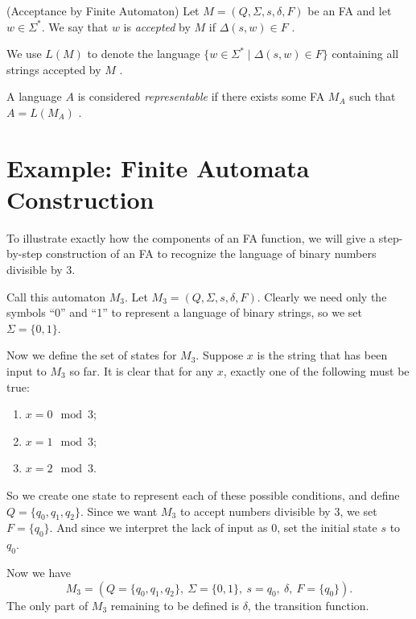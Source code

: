 \documentclass{bcthesis}
\newcommand{\footcite}[2]{\xspace\cite[pg.~{#2}]{#1}\xspace}
\begin{document}
		\begin{definition}(Acceptance by Finite Automaton)
			Let $M = (Q, \Sigma, s, \delta, F)$ be an FA and let $w \in \Sigma^*$.
			We say that $w$ is \textit{accepted} by $M$ if $\Delta(s, w) \in F$ \footcite{hopcroft}{18}.

			We use $L(M)$ to denote the language $\{ w \in \Sigma^* \mid \Delta(s, w) \in F \}$ containing all strings accepted by $M$ \footcite{hopcroft}{18}.

			A language $A$ is considered \textit{representable} if there exists some FA $M_A$ such that $A = L(M_A)$ \footcite{salomaa}{20}.
		\end{definition}

	\section{Example: Finite Automata Construction} %
	\label{sec:ex:m3_construction}
	

		\newcommand{\miii}{\ensuremath{M_3}\xspace}

		To illustrate exactly how the components of an FA function, we will give a step-by-step construction of an FA to recognize the language of binary numbers divisible by 3.

		Call this automaton \miii.
		Let $\miii = (Q, \Sigma, s, \delta, F)$.
		Clearly we need only the symbols ``0'' and ``1'' to represent a language of binary strings, so we set $\Sigma = \{ 0, 1 \}$.

		Now we define the set of states for $\miii$.
		Suppose $x$ is the string that has been input to $\miii$ so far.
		It is clear that for any $x$, exactly one of the following must be true:
		\begin{enumerate}[label = (\roman*), itemsep = -1 ex, nolistsep]
			\item $x = 0 \mod 3$;
			\item $x = 1 \mod 3$;
			\item $x = 2 \mod 3$.
		\end{enumerate}
		So we create one state to represent each of these possible conditions, and define $Q = \{ q_0, q_1, q_2 \}$.
		Since we want $\miii$ to accept numbers divisible by 3, we set $F = \{ q_0 \}$. 
		And since we interpret the lack of input as 0, set the initial state $s$ to $q_0$.

		Now we have 
		\[
			\miii = (Q = \{ q_0, q_1, q_2 \},\ \Sigma = \{ 0, 1 \},\ s = q_0,\ \delta,\ F = \{ q_0 \}).
		\]
		The only part of \miii remaining to be defined is $\delta$, the transition function.
\end{document}
